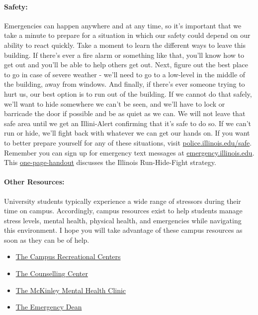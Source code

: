 \documentclass[11pt, a4paper]{article}
\begin{document}
\paragraph{Safety:}
Emergencies can happen anywhere and at any time, so it’s important that we take 
a minute to prepare for a situation in which our safety could depend on our 
ability to react quickly. Take a moment to learn the different ways to leave 
this building. If there’s ever a fire alarm or something like that, you’ll know 
how to get out and you’ll be able to help others get out. Next, figure out the 
best place to go in case of severe weather - we’ll need to go to a low-level in 
the middle of the building, away from windows. And finally, if there’s ever 
someone trying to hurt us, our best option is to run out of the building. If we 
cannot do that safely, we’ll want to hide somewhere we can’t be seen, and we’ll 
have to lock or barricade the door if possible and be as quiet as we can. We 
will not leave that safe area until we get an Illini-Alert confirming that it’s 
safe to do so. If we can’t run or hide, we’ll fight back with whatever we can 
get our hands on. If you want to better prepare yourself for any of these 
situations, visit \url{police.illinois.edu/safe}. Remember you can sign up for 
emergency text messages at \url{emergency.illinois.edu}. This 
\href{http://police.illinois.edu/dpsapp/wp-content/uploads/2017/08/syllabus-attachment.pdf}{one-page-handout} 
discusses the Illinois Run-Hide-Fight strategy.


\paragraph{Other Resources:} 
University students typically experience a wide range of stressors during their 
time on campus. Accordingly, campus resources exist to help students manage  
stress levels, mental health, physical health, and emergencies while navigating 
this environment. I hope you will take advantage of these campus resources as 
soon as they can be of help.

\begin{itemize}
\item \href{https://campusrec.illinois.edu/}{The Campus Recreational Centers}
\item \href{http://counselingcenter.illinois.edu/}{The Counselling Center}
\item \href{http://www.mckinley.illinois.edu/clinics/mental\_health.htm}{The McKinley Mental Health Clinic}
\item \href{http://odos.illinois.edu/emergency/}{The Emergency Dean}
\end{itemize}
\end{document}
